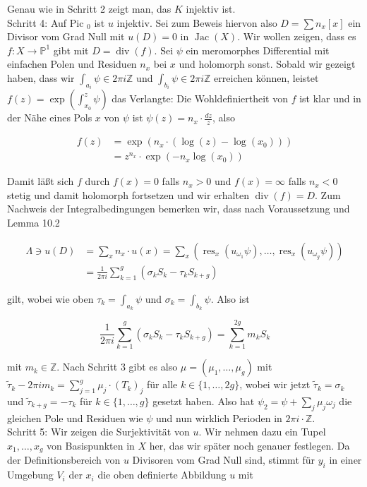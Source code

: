 \documentclass[10pt, letterpaper]{article}
\begin{document}
Genau wie in Schritt 2 zeigt man, das $K$ injektiv ist.\\
Schritt 4: Auf Pic ${ }_{0}$ ist $u$ injektiv. Sei zum Beweis hiervon also $D=\sum n_{x}[x]$ ein Divisor vom Grad Null mit $u(D)=0$ in $\operatorname{Jac}(X)$. Wir wollen zeigen, dass es $f: X \longrightarrow \mathbb{P}^{1}$ gibt mit $D=\operatorname{div}(f)$. Sei $\psi$ ein meromorphes Differential mit einfachen Polen und Residuen $n_{x}$ bei $x$ und holomorph sonst. Sobald wir gezeigt haben, dass wir $\int_{a_{i}} \psi \in 2 \pi i \mathbb{Z}$ und $\int_{b_{i}} \psi \in 2 \pi i \mathbb{Z}$ erreichen können, leistet $f(z)=\exp \left(\int_{x_{0}}^{z} \psi\right)$ das Verlangte: Die Wohldefiniertheit von $f$ ist klar und in der Nähe eines Pols $x$ von $\psi$ ist $\psi(z)=n_{x} \cdot \frac{d z}{z}$, also

$$
\begin{aligned}
f(z) & =\exp \left(n_{x} \cdot\left(\log (z)-\log \left(x_{0}\right)\right)\right) \\
& =z^{n_{x}} \cdot \exp \left(-n_{x} \log \left(x_{0}\right)\right)
\end{aligned}
$$

Damit läßt sich $f$ durch $f(x)=0$ falls $n_{x}>0$ und $f(x)=\infty$ falls $n_{x}<0$ stetig und damit holomorph fortsetzen und wir erhalten $\operatorname{div}(f)=D$. Zum Nachweis der Integralbedingungen bemerken wir, dass nach Voraussetzung und Lemma 10.2

$$
\begin{aligned}
\Lambda \ni u(D) & =\sum_{x} n_{x} \cdot u(x)=\sum_{x}\left(\operatorname{res}_{x}\left(u_{\omega_{1}} \psi\right), \ldots, \operatorname{res}_{x}\left(u_{\omega_{g}} \psi\right)\right) \\
& =\frac{1}{2 \pi i} \sum_{k=1}^{g}\left(\sigma_{k} S_{k}-\tau_{k} S_{k+g}\right)
\end{aligned}
$$

gilt, wobei wie oben $\tau_{k}=\int_{a_{k}} \psi$ und $\sigma_{k}=\int_{b_{k}} \psi$. Also ist

$$
\frac{1}{2 \pi i} \sum_{k=1}^{g}\left(\sigma_{k} S_{k}-\tau_{k} S_{k+g}\right)=\sum_{k=1}^{2 g} m_{k} S_{k}
$$

mit $m_{k} \in \mathbb{Z}$. Nach Schritt 3 gibt es also $\mu=\left(\mu_{1}, \ldots, \mu_{g}\right)$ mit $\widetilde{\tau}_{k}-2 \pi i m_{k}= \sum_{j=1}^{g} \mu_{j} \cdot\left(T_{k}\right)_{j}$ für alle $k \in\{1, \ldots, 2 g\}$, wobei wir jetzt $\widetilde{\tau}_{k}=\sigma_{k}$ und $\widetilde{\tau}_{k+g}=-\tau_{k}$ für $k \in\{1, \ldots, g\}$ gesetzt haben. Also hat $\psi_{2}=\psi+\sum_{j} \mu_{j} \omega_{j}$ die gleichen Pole und Residuen wie $\psi$ und nun wirklich Perioden in $2 \pi i \cdot \mathbb{Z}$.\\
Schritt 5: Wir zeigen die Surjektivität von $u$. Wir nehmen dazu ein Tupel $x_{1}, \ldots, x_{g}$ von Basispunkten in $X$ her, das wir später noch genauer festlegen. Da der Definitionsbereich von $u$ Divisoren vom Grad Null sind, stimmt für $y_{i}$ in einer Umgebung $V_{i}$ der $x_{i}$ die oben definierte Abbildung $u$ mit
\end{document}
